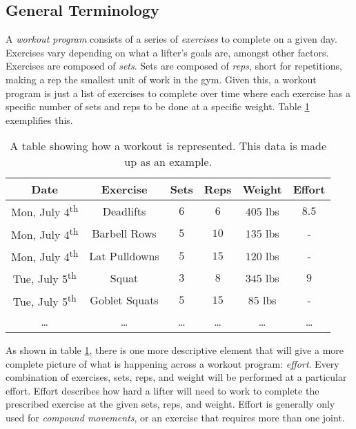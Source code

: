 \subsection{General Terminology}
\label{sec:GeneralTerminology}

A \textit{workout program} consists of a series of \textit{exercises} to complete on a given day. Exercises vary depending on what a lifter's goals are, amongst other factors. Exercises are composed of \textit{sets}. Sets are composed of \textit{reps}, short for repetitions, making a rep the smallest unit of work in the gym. Given this, a workout program is just a list of exercises to complete over time where each exercise has a specific number of sets and reps to be done at a specific weight. Table \ref{tab:WorkoutProgramExample} exemplifies this.

\begin{table}[h]
    \centering
    \begin{tabular}{c|c|c|c|c|c}
        Date & Exercise & Sets & Reps & Weight & Effort \\
        \hline
        Mon, July 4\textsuperscript{th} & Deadlifts & $6$ & $6$ & $405$ lbs & $8.5$ \\
        Mon, July 4\textsuperscript{th} & Barbell Rows & $5$ & $10$ & $135$ lbs & - \\
        Mon, July 4\textsuperscript{th} & Lat Pulldowns & $5$ & $15$ & $120$ lbs & - \\
        Tue, July 5\textsuperscript{th} & Squat & $3$ & $8$ & $345$ lbs & $9$ \\
        Tue, July 5\textsuperscript{th} & Goblet Squats & $5$ & $15$ & $85$ lbs & - \\
        \dots & \dots & \dots & \dots & \dots & \dots \\
    \end{tabular}
    \caption{A table showing how a workout is represented. This data is made up as an example.}
    \label{tab:WorkoutProgramExample}
\end{table}

As shown in table \ref{tab:WorkoutProgramExample}, there is one more descriptive element that will give a more complete picture of what is happening across a workout program: \textit{effort}. Every combination of exercises, sets, reps, and weight will be performed at a particular effort. Effort describes how hard a lifter will need to work to complete the prescribed exercise at the given sets, reps, and weight. Effort is generally only used for \textit{compound movements}, or an exercise that requires more than one joint.

